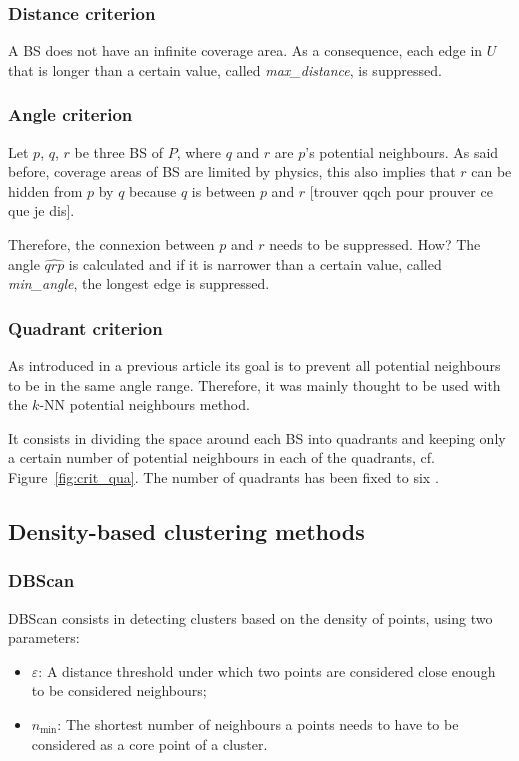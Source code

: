 \documentclass[lettersize,journal,english]{IEEEtran}
\begin{document}
        \subsubsection{Distance criterion}
            A BS does not have an infinite coverage area.
            As a consequence, each edge in $U$ that is longer than a certain value, called \emph{max\_distance}, is suppressed.

        \subsubsection{Angle criterion}
            Let $p$, $q$, $r$ be three BS of $P$, where $q$ and $r$ are $p$'s potential neighbours. As said before, coverage areas of BS are limited by physics, this also implies that $r$ can be \og hidden\fg{} from $p$ by $q$ because $q$ is between $p$ and $r$ [trouver qqch pour prouver ce que je dis].

            Therefore, the connexion between $p$ and $r$ needs to be suppressed. How? The angle $\widehat{qrp}$ is calculated and if it is narrower than a certain value, called \emph{min\_angle}, the longest edge is suppressed.

        \subsubsection{Quadrant criterion}
            As introduced in a previous article \cite{10201211} its goal is to prevent all potential neighbours to be in the same angle range. Therefore, it was mainly thought to be used with the $k$-NN potential neighbours method.

            It consists in dividing the space around each BS into quadrants and keeping only a certain number of potential neighbours in each of the quadrants, cf. Figure~\ref{fig:crit_qua}.
            The number of quadrants has been fixed to six \cite{art_del_paq}.

    \subsection{Density-based clustering methods}
        \subsubsection{DBScan}
            DBScan consists in detecting clusters based on the density of points, using two parameters:
            \begin{itemize}
                \item $\varepsilon$: A distance threshold under which two points are considered close enough to be considered neighbours;   
                \item $n_{\text{min}}$: The shortest number of neighbours a points needs to have to be considered as a core point of a cluster.
            \end{itemize}
\end{document}
